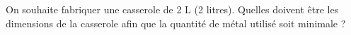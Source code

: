 \documentclass[a4paper,12pt]{article}
\begin{document}
% 
% 
% 
% 
% 
% 
% 
% 
% 
% 
% 
% 
% 
% 
% 

\begin{exercice}[title=Exercice 27 -- {[Modéliser, Calculer]}]
On souhaite fabriquer une casserole de 2 L (2 litres). Quelles doivent être les dimensions de la casserole afin que la quantité de métal utilisé soit minimale ?
\end{exercice}
\end{document}
